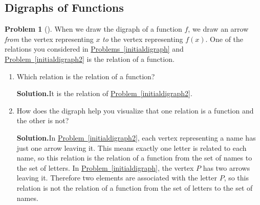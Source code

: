 \documentclass[10pt,]{book}
\theoremstyle{plain}
\theoremstyle{definition}
\newtheorem{activity}[project]{Problem}
\theoremstyle{definition}
\numberwithin{equation}{chapter}
\begin{document}
\subsection[{Digraphs of Functions}]{Digraphs of Functions}\label{digraphsoffunctions}
\begin{activity}[]\label{activity-336}
When we draw the digraph of a function \(f\), we draw an arrow \emph{from} the vertex representing \(x\) \emph{to} the vertex representing \(f(x)\).  One of the relations you considered in \hyperref[initialdigraph]{Problems~\ref{initialdigraph}} and \hyperref[initialdigraph2]{Problem~\ref{initialdigraph2}} is the relation of a function.%
\begin{enumerate}[font=\bfseries,label=(\alph*),ref=\alph*]
\item\label{task-240} Which relation is the relation of a function?%
\par\medskip\noindent%
\textbf{Solution.}\quad It is the relation of \hyperref[initialdigraph2]{Problem~\ref{initialdigraph2}}.%
\item\label{task-241} How does the digraph help you visualize that one relation is a function and the other is not?%
\par\medskip\noindent%
\textbf{Solution.}\quad In \hyperref[initialdigraph2]{Problem~\ref{initialdigraph2}}, each vertex representing a name has just one arrow leaving it. This means exactly one letter is related to each name, so this relation is the relation of a function from the set of names to the set of letters. In \hyperref[initialdigraph]{Problem~\ref{initialdigraph}}, the vertex \(P\) has two arrows leaving it. Therefore two elements are associated with the letter \(P\), so this relation is not the relation of a function from the set of letters to the set of names.%
\end{enumerate}
\end{activity}
\end{document}
